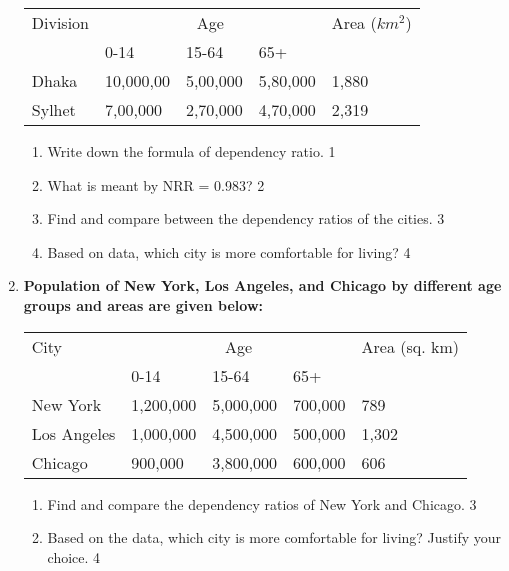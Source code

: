 \documentclass[a4paper,oneside, margin=1.4in]{book}
\begin{document}
\begin{enumerate}
	  \begin{table}[h]
	  \begin{center}
\begin{tabular}{lllll}
Division & \multicolumn{3}{c}{Age}         & Area ($km^2$) \\
         & 0-14      & 15-64    & 65+      &               \\
Dhaka    & 10,000,00 & 5,00,000 & 5,80,000 & 1,880         \\
Sylhet   & 7,00,000  & 2,70,000 & 4,70,000 & 2,319        
\end{tabular}
\end{center}
\end{table}
  
  \begin{enumerate}
    \item
	Write down the formula of dependency ratio. \hfill 1
    \item
	What is meant by NRR = 0.983? \hfill 2
    \item  
	Find and compare between the dependency ratios of the cities. \hfill 3
    \item
	Based on data, which city is more comfortable for living? \hfill 4
  \end{enumerate}
  
  \item
  \textbf{Population of New York, Los Angeles, and Chicago by different age groups and areas are given below:} 
  
  \begin{table}[h]
  \begin{center}
  \begin{tabular}{lllll}
  City         & \multicolumn{3}{c}{Age}         & Area (sq. km) \\
               & 0-14      & 15-64    & 65+      &               \\
  New York     & 1,200,000 & 5,000,000 & 700,000  & 789           \\
  Los Angeles  & 1,000,000 & 4,500,000 & 500,000  & 1,302         \\
  Chicago      & 900,000   & 3,800,000 & 600,000  & 606           \\
  \end{tabular}
  \end{center}
  \end{table}
  
  \begin{enumerate}
    \item  
    Find and compare the dependency ratios of New York and Chicago. \hfill 3
    \item
    Based on the data, which city is more comfortable for living? Justify your
    choice. \hfill 4
  \end{enumerate}


\end{enumerate}
\end{document}
